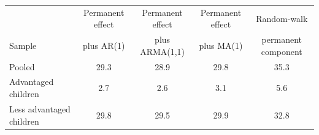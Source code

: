 \begin{tabular}{@{}lcccc@{}}
\toprule
 & Permanent effect & Permanent effect & Permanent effect & Random-walk \\
Sample & plus AR(1) & plus ARMA(1,1) & plus MA(1) & permanent component \\
\midrule
Pooled & 29.3 & 28.9 & 29.8 & 35.3 \\
Advantaged children & 2.7 & 2.6 & 3.1 & 5.6 \\
Less advantaged children & 29.8 & 29.5 & 29.9 & 32.8 \\
\bottomrule
\end{tabular}
